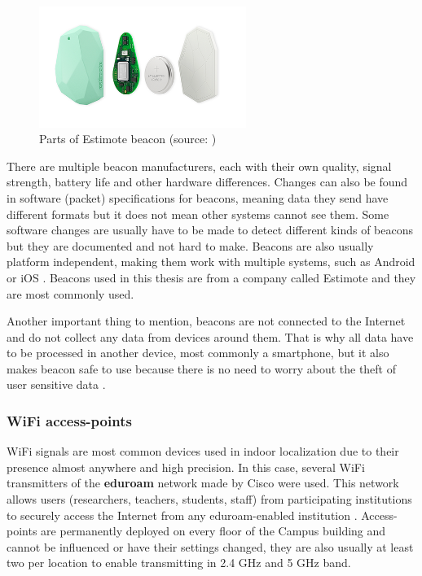 \begin{figure}[H]
	\begin{centering}
		\includegraphics[width=0.6\textwidth]{img/estimote_beacon}
		\par\end{centering}
	\caption{Parts of Estimote beacon (source: \cite{RMPFEB})\label{fig:PartsOfEstimoteBeacon}}
	\label{fig02c05}
\end{figure}

There are multiple beacon manufacturers, each with their own quality, signal strength, battery life and other hardware differences. Changes can also be found in software (packet) specifications for beacons, meaning data they send have different formats but it does not mean other systems cannot see them. Some software changes are usually have to be made to detect different kinds of beacons but they are documented and not hard to make. Beacons are also usually platform independent, making them work with multiple systems, such as Android or iOS \cite{IPSBOBLE, 10TABB}. Beacons used in this thesis are from a company called Estimote and they are most commonly used.

Another important thing to mention, beacons are not connected to the Internet and do not collect any data from devices around them. That is why all data have to be processed in another device, most commonly a smartphone, but it also makes beacon safe to use because there is no need to worry about the theft of user sensitive data \cite{10TABB}.

\subsubsection{WiFi access-points}\label{subsec:WiFiAccessPoints}
WiFi signals are most common devices used in indoor localization due to their presence almost anywhere and high precision. In this case, several WiFi transmitters of the \textbf{eduroam} network made by Cisco were used. This network allows users (researchers, teachers, students, staff) from participating institutions to securely access the Internet from any eduroam-enabled institution \cite{Eduroam}. Access-points are permanently deployed on every floor of the Campus building and cannot be influenced or have their settings changed, they are also usually at least two per location to enable transmitting in 2.4 GHz and 5 GHz band.


